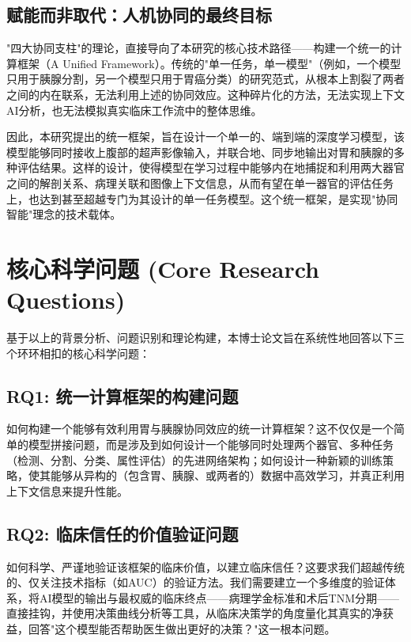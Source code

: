 \subsection{赋能而非取代：人机协同的最终目标}

"四大协同支柱"的理论，直接导向了本研究的核心技术路径——构建一个统一的计算框架（A Unified Framework）。传统的"单一任务，单一模型"（例如，一个模型只用于胰腺分割，另一个模型只用于胃癌分类）的研究范式，从根本上割裂了两者之间的内在联系，无法利用上述的协同效应。这种碎片化的方法，无法实现上下文AI分析，也无法模拟真实临床工作流中的整体思维。

因此，本研究提出的统一框架，旨在设计一个单一的、端到端的深度学习模型，该模型能够同时接收上腹部的超声影像输入，并联合地、同步地输出对胃和胰腺的多种评估结果。这样的设计，使得模型在学习过程中能够内在地捕捉和利用两大器官之间的解剖关系、病理关联和图像上下文信息，从而有望在单一器官的评估任务上，也达到甚至超越专门为其设计的单一任务模型。这个统一框架，是实现"协同智能"理念的技术载体。

\section{核心科学问题 (Core Research Questions)}

基于以上的背景分析、问题识别和理论构建，本博士论文旨在系统性地回答以下三个环环相扣的核心科学问题：

\subsection{RQ1: 统一计算框架的构建问题}

如何构建一个能够有效利用胃与胰腺协同效应的统一计算框架？这不仅仅是一个简单的模型拼接问题，而是涉及到如何设计一个能够同时处理两个器官、多种任务（检测、分割、分类、属性评估）的先进网络架构；如何设计一种新颖的训练策略，使其能够从异构的（包含胃、胰腺、或两者的）数据中高效学习，并真正利用上下文信息来提升性能。

\subsection{RQ2: 临床信任的价值验证问题}

如何科学、严谨地验证该框架的临床价值，以建立临床信任？这要求我们超越传统的、仅关注技术指标（如AUC）的验证方法。我们需要建立一个多维度的验证体系，将AI模型的输出与最权威的临床终点——病理学金标准和术后TNM分期——直接挂钩，并使用决策曲线分析等工具，从临床决策学的角度量化其真实的净获益，回答"这个模型能否帮助医生做出更好的决策？"这一根本问题。

